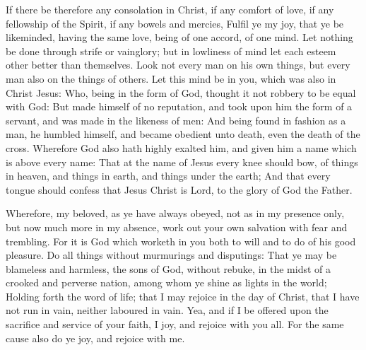  If there be therefore any consolation in Christ, if any
comfort of love, if any fellowship of the Spirit, if any bowels and
mercies,  Fulfil ye my joy, that ye be likeminded, having
the same love, being of one accord, of one mind.  Let
nothing be done through strife or vainglory; but in lowliness of mind
let each esteem other better than themselves.  Look not
every man on his own things, but every man also on the things of others.
 Let this mind be in you, which was also in Christ Jesus:
 Who, being in the form of God, thought it not robbery to be
equal with God:  But made himself of no reputation, and took
upon him the form of a servant, and was made in the likeness of men:
 And being found in fashion as a man, he humbled himself,
and became obedient unto death, even the death of the cross.
 Wherefore God also hath highly exalted him, and given him a
name which is above every name:  That at the name of Jesus
every knee should bow, of things in heaven, and things in earth, and
things under the earth;  And that every tongue should
confess that Jesus Christ is Lord, to the glory of God the Father.

 Wherefore, my beloved, as ye have always obeyed, not as in
my presence only, but now much more in my absence, work out your own
salvation with fear and trembling.  For it is God which
worketh in you both to will and to do of his good pleasure.
 Do all things without murmurings and disputings:
 That ye may be blameless and harmless, the sons of God,
without rebuke, in the midst of a crooked and perverse nation, among
whom ye shine as lights in the world;  Holding forth the
word of life; that I may rejoice in the day of Christ, that I have not
run in vain, neither laboured in vain.  Yea, and if I be
offered upon the sacrifice and service of your faith, I joy, and rejoice
with you all.  For the same cause also do ye joy, and
rejoice with me.

